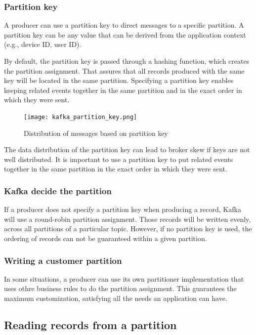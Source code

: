 \subsubsection{Partition key}

A producer can use a partition key to direct messages to a specific partition.
A partition key can be any value that can be derived from the application
context (e.g., device ID, user ID).

By default, the partition key is passed through a hashing function, which
creates the partition assignment. That assures that all records produced with
the same key will be located in the same partition. Specifying a partition key
enables keeping related events together in the same partition and in the exact
order in which they were sent.

\begin{figure}[ht]
    \centering
    \texttt{[image: kafka\_partition\_key.png]}
    \caption{Distribution of messages based on partition key}
\end{figure}

The data distribution of the partition key can lead to broker skew if keys are
not well distributed. It is important to use a partition key to put related
events together in the same partition in the exact order in which they were
sent.

\subsubsection{Kafka decide the partition}

If a producer does not specify a partition key when producing a record, Kafka
will use a round-robin partition assignment. Those records will be written
evenly, across all partitions of a particular topic.
However, if no partition key is used, the ordering of records can not be
guaranteed within a given partition.

\subsubsection{Writing a customer partition}

In some situations, a producer can use its own partitioner implementation that
uses othre business rules to do the partition assignment.
This guarantees the maximum customization, satisfying all the needs an
application can have.

\subsection{Reading records from a partition}

